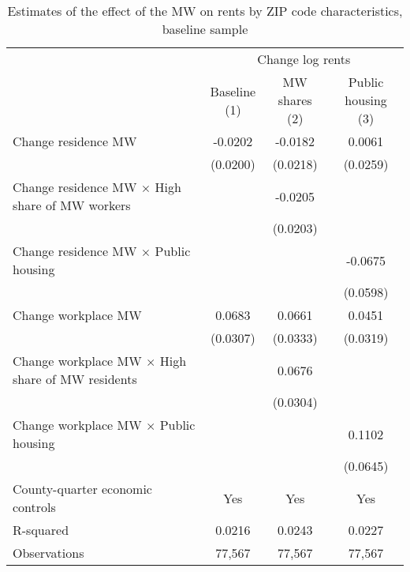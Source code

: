 \begin{table}[hbt!] \centering
    \caption{Estimates of the effect of the MW on rents by ZIP code characteristics, baseline sample}
    \label{tab:heterogeneity}
    \begin{tabular}{@{}lccc@{}}
        \toprule
            & \multicolumn{3}{c}{Change log rents}                                                  \\ \cmidrule(l){2-4} 
            & \shortstack{Baseline\\(1)} 
            & \shortstack{MW shares\\(2)}                                             
            & \shortstack{Public housing\\(3)}                                                      \\ \midrule
        Change residence MW                                     &  -0.0202   &  -0.0182  &  0.0061   \\
                                                                & (0.0200)  & (0.0218) & (0.0259)  \\
        Change residence MW $\times$ High share of MW workers   &        &  -0.0205  &        \\
                                                                &        & (0.0203) &        \\
        Change residence MW $\times$ Public housing             &        &       &  -0.0675   \\
                                                                &        &       & (0.0598)  \\
        Change workplace MW                                     &  0.0683   &  0.0661  &  0.0451   \\
                                                                & (0.0307)  & (0.0333) & (0.0319)  \\
        Change workplace MW $\times$ High share of MW residents &        &  0.0676  &        \\
                                                                &        & (0.0304) &        \\
        Change workplace MW $\times$ Public housing             &        &       &  0.1102   \\
                                                                &        &       & (0.0645)  \\
        County-quarter economic controls                        &  Yes   &  Yes  &   Yes  \\
        R-squared                                               &  0.0216   &  0.0243  &   0.0227  \\
        Observations                                            &  77,567  &  77,567 &   77,567 \\ \bottomrule
    \end{tabular}


\end{table}
